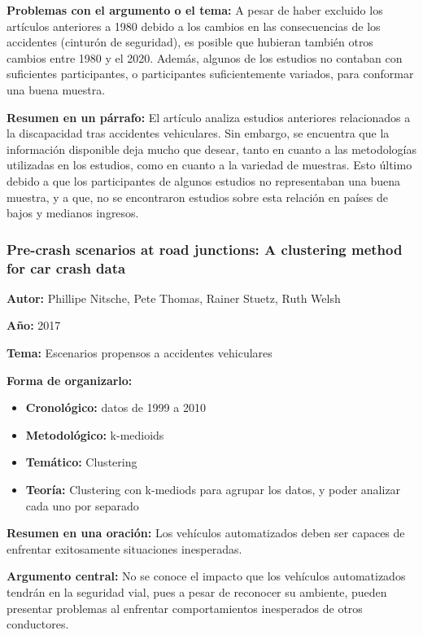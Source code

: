 \documentclass{book}
\begin{document}
\textbf{Problemas con el argumento o el tema:} A pesar de haber excluido los artículos anteriores a 1980 debido a los cambios en las consecuencias de los accidentes (cinturón de seguridad), es posible que hubieran también otros cambios entre 1980 y el 2020. Además, algunos de los estudios no contaban con suficientes participantes, o participantes suficientemente variados, para conformar una buena muestra.

\textbf{Resumen en un párrafo:} El artículo analiza estudios anteriores relacionados a la discapacidad tras accidentes vehiculares. Sin embargo, se encuentra que la información disponible deja mucho que desear, tanto en cuanto a las metodologías utilizadas en los estudios, como en cuanto a la variedad de muestras. Esto último debido a que los participantes de algunos estudios no representaban una buena muestra, y a que, no se encontraron estudios sobre esta relación en países de bajos y medianos ingresos.

\subsubsection{Pre-crash scenarios at road junctions: A clustering method for car crash data}
\textbf{Autor:} Phillipe Nitsche, Pete Thomas, Rainer Stuetz, Ruth Welsh

\textbf{Año:} 2017

\textbf{Tema:} Escenarios propensos a accidentes vehiculares

\textbf{Forma de organizarlo:}

\begin{itemize}
\setlength{\itemindent}{0.5in}
    \item \textbf{Cronológico:} datos de 1999 a 2010
    \item \textbf{Metodológico:} k-medioids
    \item \textbf{Temático:} Clustering
    \item \textbf{Teoría:} Clustering con k-mediods para agrupar los datos, y poder analizar cada uno por separado
\end{itemize}

\textbf{Resumen en una oración:} Los vehículos automatizados deben ser capaces de enfrentar exitosamente situaciones inesperadas.

\textbf{Argumento central:} No se conoce el impacto que los vehículos automatizados tendrán en la seguridad vial, pues a pesar de reconocer su ambiente, pueden presentar problemas al enfrentar comportamientos inesperados de otros conductores.
\end{document}
